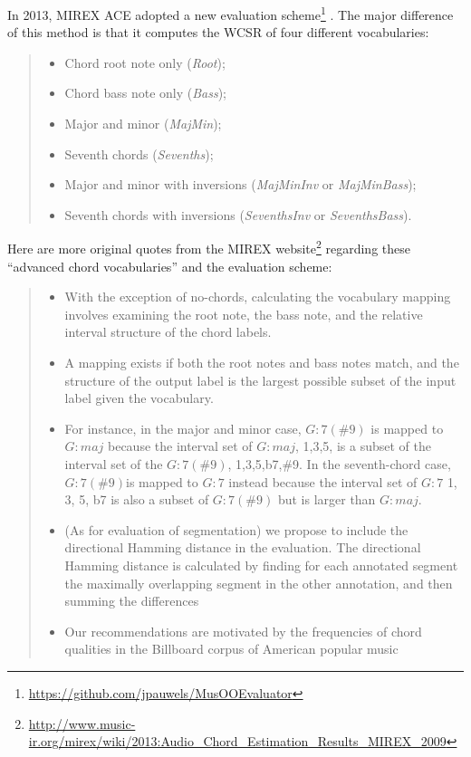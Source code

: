 In 2013, MIREX ACE adopted a new evaluation scheme\footnote{\url{https://github.com/jpauwels/MusOOEvaluator}} \cite{pauwels2013evaluating}. The major difference of this method is that it computes the WCSR of four different vocabularies:
\begin{quote}
\begin{itemize}
\item Chord root note only ({\it Root});
\item Chord bass note only ({\it Bass});
\item Major and minor ({\it MajMin});
\item Seventh chords ({\it Sevenths});
\item Major and minor with inversions ({\it MajMinInv} or {\it MajMinBass});
\item Seventh chords with inversions ({\it SeventhsInv} or {\it SeventhsBass}).
\end{itemize}
\end{quote}
Here are more original quotes from the MIREX website\footnote{\url{http://www.music-ir.org/mirex/wiki/2013:Audio\_Chord\_Estimation\_Results\_MIREX\_2009}} regarding these ``advanced chord vocabularies'' and the evaluation scheme:
\begin{quote}
\begin{itemize}
\item With the exception of no-chords, calculating the vocabulary mapping involves examining the root note, the bass note, and the relative interval structure of the chord labels.
\item A mapping exists if both the root notes and bass notes match, and the structure of the output label is the largest possible subset of the input label given the vocabulary.
\item For instance, in the major and minor case, $G:7(\#9)$ is mapped to $G:maj$ because the interval set of $G:maj$, {1,3,5}, is a subset of the interval set of the $G:7(\#9)$, {1,3,5,b7,\#9}. In the seventh-chord case, $G:7(\#9)$is mapped to $G:7$ instead because the interval set of $G:7$ {1, 3, 5, b7} is also a subset of $G:7(\#9)$ but is larger than $G:maj$.
\item (As for evaluation of segmentation) we propose to include the directional Hamming distance in the evaluation. The directional Hamming distance is calculated by finding for each annotated segment the maximally overlapping segment in the other annotation, and then summing the differences \cite{abdallah2005theory,mauch2010automatic}
\item Our recommendations are motivated by the frequencies of chord qualities in the Billboard corpus of American popular music \cite{burgoyne2011expert}
\end{itemize}
\end{quote}

